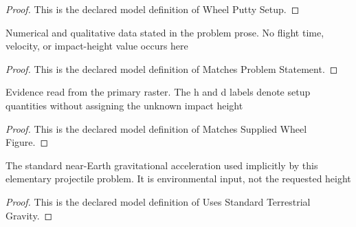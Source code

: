\begin{proof}
  This is the declared model definition of Wheel Putty Setup.
\end{proof}
\begin{definition}
  \label{def:physics:phyx-mini-0753:phyxminiproblems-problemphyxmini0753-matchesproblemstatement}
  Numerical and qualitative data stated in the problem prose. No flight time, velocity, or impact-height value occurs here
\end{definition}
\begin{proof}
  This is the declared model definition of Matches Problem Statement.
\end{proof}
\begin{definition}
  \label{def:physics:phyx-mini-0753:phyxminiproblems-problemphyxmini0753-matchessuppliedwheelfigure}
  Evidence read from the primary raster. The h and d labels denote setup quantities without assigning the unknown impact height
\end{definition}
\begin{proof}
  This is the declared model definition of Matches Supplied Wheel Figure.
\end{proof}
\begin{definition}
  \label{def:physics:phyx-mini-0753:phyxminiproblems-problemphyxmini0753-usesstandardterrestrialgravity}
  The standard near-Earth gravitational acceleration used implicitly by this elementary projectile problem. It is environmental input, not the requested height
\end{definition}
\begin{proof}
  This is the declared model definition of Uses Standard Terrestrial Gravity.
\end{proof}
